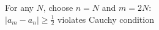 \documentclass[preview]{standalone}
\begin{document}
\begin{center}
For any $N$, choose $n=N$ and $m=2N$:\\$|a_m - a_n| \geq \frac{1}{2}$ violates Cauchy condition
\end{center}
\end{document}
